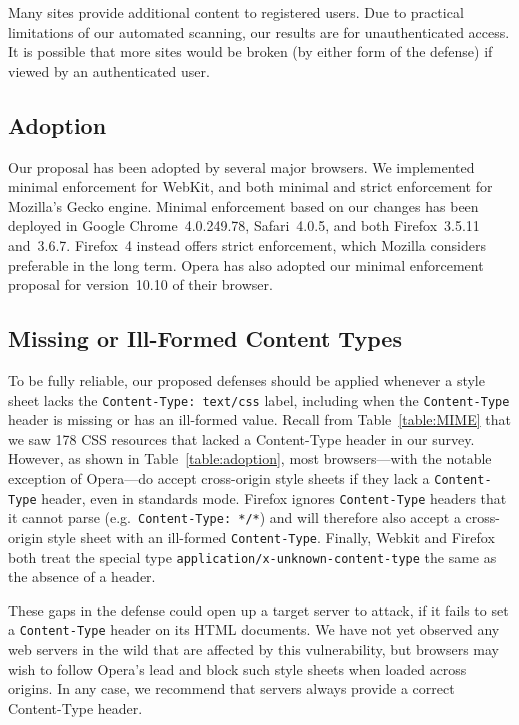 \documentclass{acm_proc_article-sp}
\begin{document}
Many sites provide additional content to registered users. Due
to practical limitations of our automated scanning, our results
are for unauthenticated access. It is possible that more sites
would be broken (by either form of the defense) if viewed by an
authenticated user.

\subsection{Adoption}
Our proposal has been adopted by several major browsers. We
implemented minimal enforcement for WebKit, and both minimal and
strict enforcement for Mozilla's Gecko engine. Minimal enforcement
based on our changes has been deployed in Google Chrome~4.0.249.78,
Safari~4.0.5, and both Firefox~3.5.11 and~3.6.7. Firefox~4 instead
offers strict enforcement, which Mozilla considers preferable in the
long term. Opera has also adopted our minimal enforcement proposal
for version~10.10 of their browser.

\subsection{Missing or Ill-Formed Content Types}\label{sec:missing}
To be fully reliable, our proposed defenses should be applied whenever
a style sheet lacks the \verb|Content-Type: text/css| label, including
when the \texttt{Content-Type} header is missing or has an ill-formed
value.  Recall from Table~\ref{table:MIME} that we saw 178 CSS
resources that lacked a Content-Type header in our survey.  However,
as shown in Table~\ref{table:adoption}, most browsers---with the
notable exception of Opera---do accept cross-origin style sheets if
they lack a \texttt{Content-Type} header, even in standards mode.
Firefox ignores \texttt{Content-Type} headers that it cannot parse
(e.g.~\verb|Content-Type: */*|) and will therefore also accept a
cross-origin style sheet with an ill-formed \texttt{Content-Type}.
Finally, Webkit and Firefox both treat the special type
\texttt{application/x-unknown-content-type} the same as the absence of
a header.

These gaps in the defense could open up a target server to attack, if
it fails to set a \texttt{Content-Type} header on its HTML
documents. We have not yet observed any web servers in the wild that
are affected by this vulnerability, but browsers may wish to follow
Opera's lead and block such style sheets when loaded across
origins. In any case, we recommend that servers always provide a
correct Content-Type header.
\end{document}
